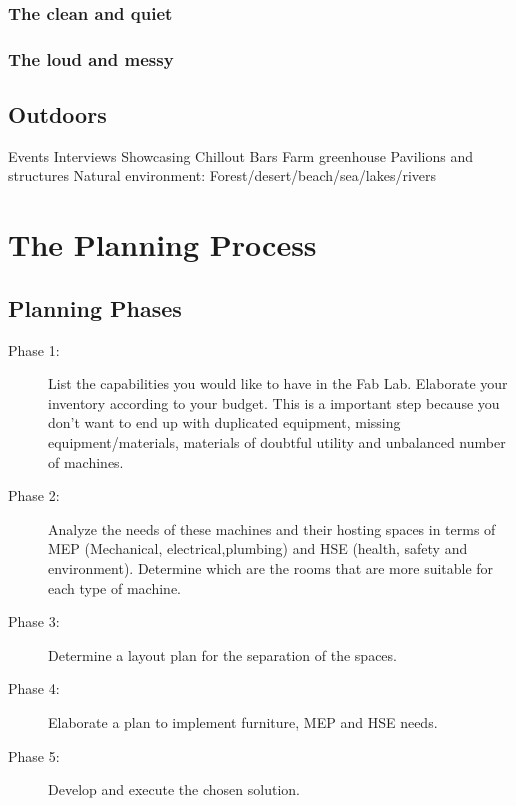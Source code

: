 \documentclass[a4paper,12pt,titlepage]{article}
\begin{document}
\subsubsection{The clean and quiet}

\subsubsection{The loud and messy} 


\subsection{Outdoors}
Events
Interviews
Showcasing
Chillout Bars
Farm greenhouse
Pavilions and structures
Natural environment: Forest/desert/beach/sea/lakes/rivers




\clearpage 
\section{The Planning Process}
\subsection{Planning Phases}
\begin{description}
\item [Phase 1:] List the capabilities you would like to have in the Fab Lab. Elaborate your inventory according to your budget. This is a important step because you don't want to end up with duplicated equipment, missing equipment/materials, materials of doubtful utility and unbalanced number of machines.

\item [Phase 2:] Analyze the needs of these machines and their hosting spaces in terms of MEP (Mechanical, electrical,plumbing) and HSE (health, safety and environment). Determine which are the rooms that are
more suitable for each type of machine.
\item [Phase 3:] Determine a layout plan for the separation of the spaces.
\item [Phase 4:] Elaborate a plan to implement furniture, MEP and HSE needs.
\item [Phase 5:] Develop and execute the chosen solution.

\end{description}
\end{document}
